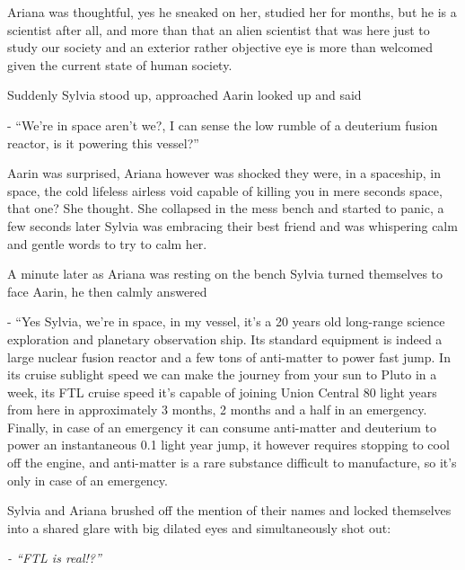 \documentclass[colorlinks,12pt,a4paper]{book}
\begin{document}
Ariana was thoughtful, yes he sneaked on her, studied her for months, but he is a scientist after all, 
and more than that an alien scientist that was here just to study our society and an exterior rather objective 
eye is more than welcomed given the current state of human society.\par
\bigskip

Suddenly Sylvia stood up, approached Aarin looked up and said \par
\bigskip
- “We're in space aren't we?, I can sense the low rumble of a deuterium fusion reactor, is it powering this vessel?” \par
\bigskip

Aarin was surprised, Ariana however was shocked they were, in a spaceship, in space, the cold lifeless airless void 
capable of killing you in mere seconds space, that one? She thought. She collapsed in the mess bench and started to panic, 
a few seconds later Sylvia was embracing their best friend and was whispering calm and gentle words to try to calm her.\par
\bigskip

A minute later as Ariana was resting on the bench Sylvia turned themselves to face Aarin, he then calmly answered\par
\bigskip

- “Yes Sylvia, we're in space, in my vessel, it's a 20 years old long-range science exploration 
and planetary observation ship. Its standard equipment is indeed a large nuclear fusion reactor and a 
few tons of anti-matter to power fast jump. In its cruise sublight speed we can make the journey from your sun 
to Pluto in a week, its FTL cruise speed it's capable of joining Union Central 80 light years from here 
in approximately 3 months, 2 months and a half in an emergency. Finally, in case of an emergency it can consume 
anti-matter and deuterium to power an instantaneous 0.1 light year jump, it however requires stopping to cool 
off the engine, and anti-matter is a rare substance difficult to manufacture, so it's only in case of an emergency.\par
\bigskip

Sylvia and Ariana brushed off the mention of their names and locked themselves into a shared glare with big 
dilated eyes and simultaneously shot out:\par
\bigskip

\textit{- “FTL is real!?”}\par
\bigskip
\end{document}
